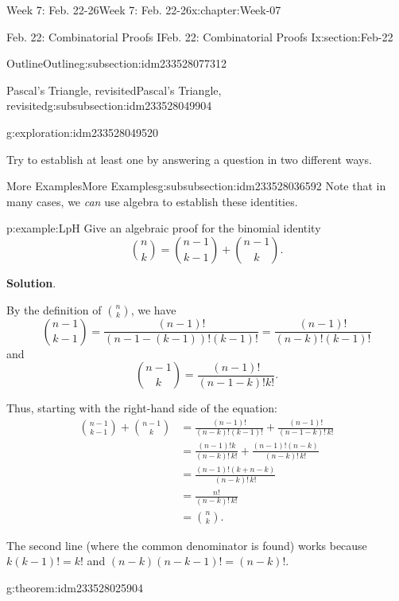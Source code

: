 \documentclass[oneside,10pt,]{book}
\newcommand{\blocktitlefont}{\relax}
\numberwithin{equation}{section}
\newcommand{\amp}{&}
\begin{document}
\begin{chapterptx}{Week 7: Feb. 22-26}{}{Week 7: Feb. 22-26}{}{}{x:chapter:Week-07}
\begin{sectionptx}{Feb. 22: Combinatorial Proofs I}{}{Feb. 22: Combinatorial Proofs I}{}{}{x:section:Feb-22}
\begin{subsectionptx}{Outline}{}{Outline}{}{}{g:subsection:idm233528077312}
\begin{subsubsectionptx}{Pascal's Triangle, revisited}{}{Pascal's Triangle, revisited}{}{}{g:subsubsection:idm233528049904}
\begin{exploration}{}{g:exploration:idm233528049520}
\begin{enumerate}
\end{enumerate}
Try to establish at least one by answering a question in two different ways.%
\end{exploration}%
\end{subsubsectionptx}
%
%
\typeout{************************************************}
\typeout{************************************************}
%
\begin{subsubsectionptx}{More Examples}{}{More Examples}{}{}{g:subsubsection:idm233528036592}
Note that in many cases, we \emph{can} use algebra to establish these identities.%
\begin{example}{}{p:example:LpH}%
Give an algebraic proof for the binomial identity%
\begin{equation*}
{n \choose k} = {n-1\choose k-1} + {n-1 \choose k}\text{.}
\end{equation*}
%
\par\smallskip%
\noindent\textbf{\blocktitlefont Solution}.\hypertarget{p:solution:AQC}{}\quad{}\begin{solutionproof}
By the definition of \({n \choose k}\), we have%
\begin{equation*}
{n-1 \choose k-1} = \frac{(n-1)!}{(n-1-(k-1))!(k-1)!} = \frac{(n-1)!}{(n-k)!(k-1)!}
\end{equation*}
and%
\begin{equation*}
{n-1 \choose k} = \frac{(n-1)!}{(n-1-k)!k!}\text{.}
\end{equation*}
%
\par
Thus, starting with the right-hand side of the equation:%
\begin{align*}
{n-1 \choose k-1} + {n-1 \choose k} \amp = \frac{(n-1)!}{(n-k)!(k-1)!}+ \frac{(n-1)!}{(n-1-k)!\,k!}\\
\amp = \frac{(n-1)!k}{(n-k)!\,k!} + \frac{(n-1)!(n-k)}{(n-k)!\,k!}\\
\amp = \frac{(n-1)!(k+n-k)}{(n-k)!\,k!}\\
\amp = \frac{n!}{(n-k)!\, k!}\\
\amp = {n \choose k}\text{.}
\end{align*}
%
\par
The second line (where the common denominator is found) works because \(k(k-1)! = k!\) and \((n-k)(n-k-1)! = (n-k)!\).%
\end{solutionproof}
\end{example}
\begin{theorem}{}{}{g:theorem:idm233528025904}%
%
\begin{equation*}

\end{equation*}
\end{theorem}
\end{subsubsectionptx}
\end{subsectionptx}
\end{sectionptx}
\end{chapterptx}
\end{document}
